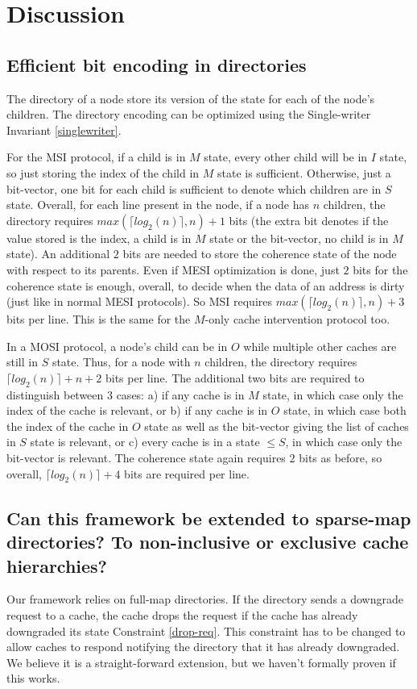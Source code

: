 \section{Discussion}
\label{sec:discussion}

\subsection{Efficient bit encoding in directories}
The directory of a node store its version of the state for each of the node's
children. The directory encoding can be optimized using the Single-writer
Invariant \ref{singlewriter}.

For the MSI protocol, if a child is in $M$ state, every other child will be in
$I$ state, so just storing the index of the child in $M$ state is sufficient.
Otherwise, just a bit-vector, one bit for each child is sufficient to denote
which children are in $S$ state. Overall, for each line present in the node,
if a node has $n$ children, the directory requires $max(\lceil log_2(n)\rceil, n)
+ 1$ bits (the extra bit denotes if the value stored is the index, \ie a child
is in $M$ state or the bit-vector, \ie no child is in $M$ state). An additional
$2$ bits are needed to store the coherence state of the node with respect to its
parents. Even if MESI optimization is done, just $2$ bits for the coherence
state is enough, overall, to decide when the data of an address is dirty (just
like in normal MESI protocols). So MSI requires $max(\lceil log_2(n)\rceil, n)
+ 3$ bits per line. This is the same for the $M$-only cache intervention
protocol too.

In a MOSI protocol, a node's child can be in $O$ while multiple other caches are
still in $S$ state. Thus, for a node with $n$ children, the directory requires
$\lceil log_2(n)\rceil + n + 2$ bits per line. The additional two bits are
required to distinguish between 3 cases: a) if any cache is in $M$ state, in
which case only the index of the cache is relevant, or b) if any cache is in $O$
state, in which case both the index of the cache in $O$ state as well as the
bit-vector giving the list of caches in $S$ state is relevant, or c) every cache
is in a state $\le S$, in which case only the bit-vector is relevant. The
coherence state again requires $2$ bits as before, so overall, $\lceil log_2(n)
\rceil + 4$ bits are required per line.

\subsection{Can this framework be extended to sparse-map directories? To
non-inclusive or exclusive cache hierarchies?}
Our framework relies on full-map directories. If the directory sends a downgrade
request to a cache, the cache drops the request if the cache has already
downgraded its state Constraint \ref{drop-req}. This constraint has to be
changed to allow caches to respond notifying the directory that it has already
downgraded. We believe it is a straight-forward extension, but we haven't
formally proven if this works.

